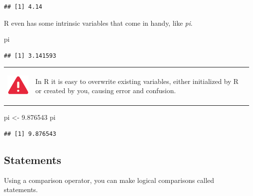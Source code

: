 \documentclass[
]{book}
\newenvironment{Shaded}{\begin{snugshade}}{\end{snugshade}}
\newcommand{\FloatTok}[1]{\textcolor[rgb]{0.00,0.00,0.81}{#1}}
\newcommand{\NormalTok}[1]{#1}
\newcommand{\OtherTok}[1]{\textcolor[rgb]{0.56,0.35,0.01}{#1}}
\begin{document}
\begin{verbatim}
## [1] 4.14
\end{verbatim}

R even has some intrinsic variables that come in handy, like \emph{pi}.

\begin{Shaded}
\begin{Highlighting}[]
\NormalTok{pi}
\end{Highlighting}
\end{Shaded}

\begin{verbatim}
## [1] 3.141593
\end{verbatim}

\hfill\break

\begin{longtable}[]{@{}
  >{\raggedright\arraybackslash}p{}
  >{\raggedright\arraybackslash}p{}@{}}
\toprule\noalign{}
\endhead
\bottomrule\noalign{}
\endlastfoot
\includegraphics[width=\textwidth,height=0.70833in]{images/02.png} & In R it is easy to overwrite existing variables, either initialized by R or created by you, causing error and confusion. \\
\end{longtable}

\hfill\break

\begin{Shaded}
\begin{Highlighting}[]
\NormalTok{pi }\OtherTok{\textless{}{-}} \FloatTok{9.876543}
\NormalTok{pi}
\end{Highlighting}
\end{Shaded}

\begin{verbatim}
## [1] 9.876543
\end{verbatim}

\hypertarget{statements}{%
\subsection{Statements}\label{statements}}

Using a comparison operator, you can make logical comparisons called statements.
\end{document}
